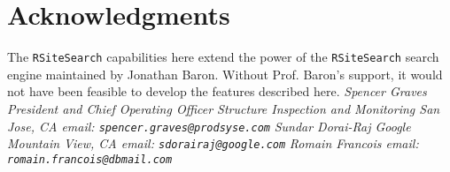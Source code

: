 \section*{Acknowledgments}
The {\tt RSiteSearch} capabilities here extend the power of the
{\tt RSiteSearch} search engine maintained by Jonathan Baron.
Without Prof. Baron's support, it would not have been feasible
to develop the features described here.
\newline \newline
\emph{Spencer Graves \newline
President and Chief Operating Officer \newline
Structure Inspection and Monitoring \newline
San Jose, CA \newline
email:  {\tt spencer.graves@prodsyse.com} }
\newline \newline
\emph{Sundar Dorai-Raj \newline
Google \newline
Mountain View, CA \newline
email:  {\tt sdorairaj@google.com} }
\newline \newline
\emph{Romain Francois \newline
\newline
\newline
email:  {\tt romain.francois@dbmail.com} }

